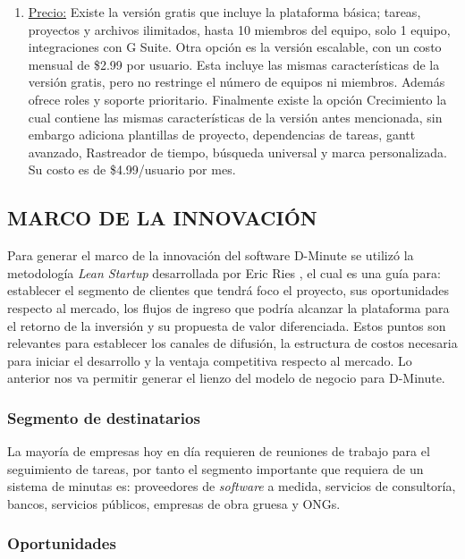 \begin{enumerate}[1.]
\begin{enumerate}[a]
	    \item \underline{Precio:} Existe la versión gratis que incluye la plataforma básica; tareas, proyectos y archivos ilimitados, hasta 10 miembros del equipo, solo 1 equipo, integraciones con G Suite. Otra opción es la versión escalable, con un costo mensual de \$2.99 por usuario. Esta incluye las mismas características de la versión gratis, pero no restringe el número de equipos ni miembros. Además ofrece roles y soporte prioritario. Finalmente existe la opción Crecimiento la cual contiene las mismas características de la versión antes mencionada, sin embargo adiciona plantillas de proyecto, dependencias de tareas, gantt avanzado, Rastreador de tiempo, búsqueda universal y marca personalizada. Su costo es de \$4.99/usuario por mes.
    \end{enumerate}	      
\end{enumerate}

\subsection{MARCO DE LA INNOVACIÓN}

Para generar el marco de la innovación del software D-Minute se utilizó la metodología \textit{Lean Startup} desarrollada por Eric Ries , el cual es una guía para: establecer el segmento de clientes que tendrá foco el proyecto, sus oportunidades respecto al mercado, los flujos de ingreso que podría alcanzar la plataforma para el retorno de la inversión y su propuesta de valor diferenciada. Estos puntos son relevantes para establecer los canales de difusión, la estructura de costos necesaria para iniciar el desarrollo y la ventaja competitiva respecto al mercado. Lo anterior nos va permitir generar el lienzo del modelo de negocio para D-Minute.

\subsubsection{Segmento de destinatarios}

La mayoría de empresas hoy en día requieren de reuniones de trabajo para el seguimiento de tareas, por tanto el segmento importante que requiera de un sistema de minutas es: proveedores de \textit{software} a medida, servicios de consultoría, bancos, servicios públicos, empresas de obra gruesa y ONGs.

\subsubsection{Oportunidades}

